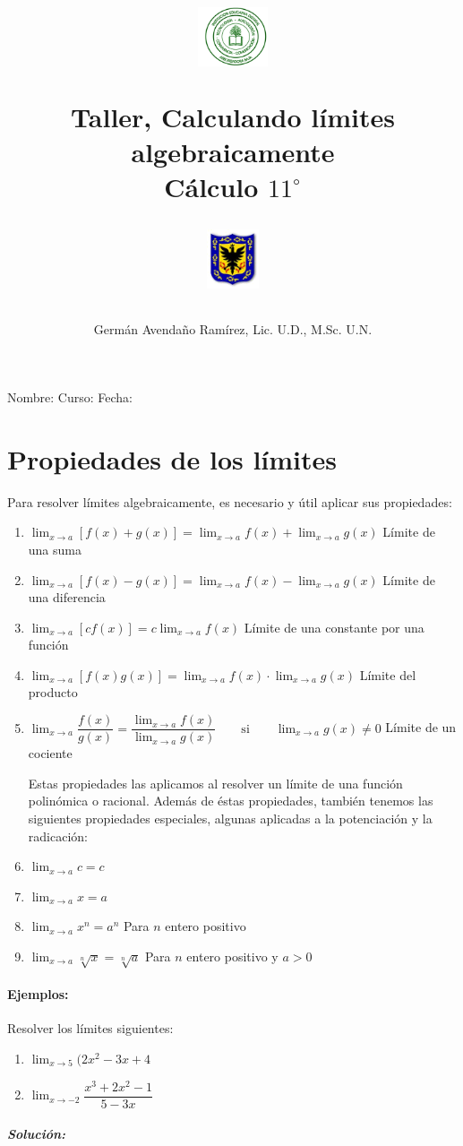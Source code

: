 \documentclass[10pt,twoside]{article}
\author{Germ\'an Avenda\~no Ram\'irez, Lic. U.D., M.Sc. U.N.}
\title{\begin{minipage}{.2\textwidth}
\includegraphics[height=1.75cm]{Images/logo-colegio.png}\end{minipage}
\begin{minipage}{.55\textwidth}
\begin{center}
Taller, Calculando límites algebraicamente\\
Cálculo $11^{\circ}$
\end{center}
\end{minipage}\hfill
\begin{minipage}{.2\textwidth}
\includegraphics[height=1.75cm]{Images/logo-sed.png} 
\end{minipage}}
\date{}
\begin{document}
\maketitle
Nombre: \hrulefill Curso: \underline{\hspace*{44pt}} Fecha: \underline{\hspace*{2.5cm}}
\section*{Propiedades de los l\'{i}mites}
Para resolver l\'{i}mites algebraicamente, es necesario y \'{u}til aplicar sus propiedades:
\begin{enumerate}
\item $\displaystyle{\lim_{x \rightarrow a}[f(x)+g(x)]=\lim_{x \rightarrow a}f(x)+\lim_{x\rightarrow a}g(x)}$ \hfill Límite de una suma
\item $\displaystyle{\lim_{x\rightarrow a}[f(x)-g(x)]=\lim_{x\rightarrow a}f(x)-\lim_{x\rightarrow a}g(x)}$ \hfill Límite de una diferencia
\item $\displaystyle{\lim_{x\rightarrow a}[cf(x)]=c\lim_{x\rightarrow a}f(x)}$ \hfill Límite de una constante por una función
\item $\displaystyle{\lim_{x\rightarrow a}[f(x)g(x)]=\lim_{x\rightarrow a}f(x)\cdot \lim_{x\rightarrow a}g(x)}$ \hfill Límite del producto
\item $\displaystyle{\lim_{x\rightarrow a}\dfrac{f(x)}{g(x)}}=\dfrac{\displaystyle{\lim_{x\rightarrow a}}f(x)}{\displaystyle{\lim_{x\rightarrow a}}g(x)} \qquad \text{si} \qquad \displaystyle{\lim_{x\rightarrow a}g(x)\neq 0}$ \hfill Límite de un cociente

Estas propiedades las aplicamos al resolver un límite de una función polinómica o racional. Además de éstas propiedades, también tenemos las siguientes propiedades especiales, algunas aplicadas a la potenciación y la radicación:
\item $\displaystyle{\lim_{x\rightarrow a}}c=c$
\item $\displaystyle{\lim_{x\rightarrow a}}x=a$
\item $\displaystyle{\lim_{x\rightarrow a}}x^{n}=a^{n}$ \hspace*{1cm} Para $n$ entero positivo
\item $\displaystyle{\lim_{x\rightarrow a}}\sqrt[n]{x}=\sqrt[n]{a}$ \hspace*{1cm} Para $n$ entero positivo y $a>0$
\end{enumerate}
\paragraph*{Ejemplos:} Resolver los límites siguientes: 
\begin{enumerate}
\item $\displaystyle{\lim_{x\rightarrow 5}}(2x^{2}-3x+4$
\item $\displaystyle{\lim_{x\rightarrow -2}}\dfrac{x^{3}+2x^{2}-1}{5-3x}$
\end{enumerate}
\subparagraph*{Solución:}
\end{document}
